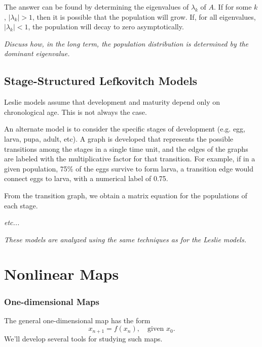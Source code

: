 \documentclass[reqno]{immbook}
\numberwithin{equation}{chapter}
\numberwithin{question}{section}
\numberwithin{theorem}{chapter}
\numberwithin{figure}{chapter}
\theoremstyle{definition}
\begin{document}
The answer can be found by determining the eigenvalues
of $\lambda_k$ of $A$.
If for some $k$,  $|\lambda_k| > 1$, then it is possible
that the population will grow.  If, for all eigenvalues,
$|\lambda_k| < 1$, the population will decay to zero
asymptotically.

\medskip
\noindent
\emph{Discuss how, in the long term, the population
distribution is determined by the dominant eigenvalue.}

\section{Stage-Structured Lefkovitch Models}
Leslie models assume that development and maturity
depend only on chronological age.  This is not always
the case.

An alternate model is to consider the specific stages
of development (e.g. egg, larva, pupa, adult, etc).
A graph is developed that represents the possible transitions
among the stages in a single time unit, and the edges
of the graphs are labeled with the multiplicative
factor for that transition.  For example, if in a given
population, 75\% of the eggs survive to form larva,
a transition edge would connect eggs to larva, with
a numerical label of 0.75.

From the transition graph, we obtain a matrix equation
for the populations of each stage.

\emph{etc...}

\noindent
\emph{These models are analyzed using the same techniques
as for the Leslie models.}

\newpage


\chapter{Nonlinear Maps}
\subsection*{One-dimensional Maps}
The general one-dimensional map has the form
\begin{equation}
   x_{n+1} = f(x_n), \quad \textrm{given $x_0$}.
\label{eqn:onedmap}
\end{equation}
We'll develop several tools for studying such maps.
\end{document}
